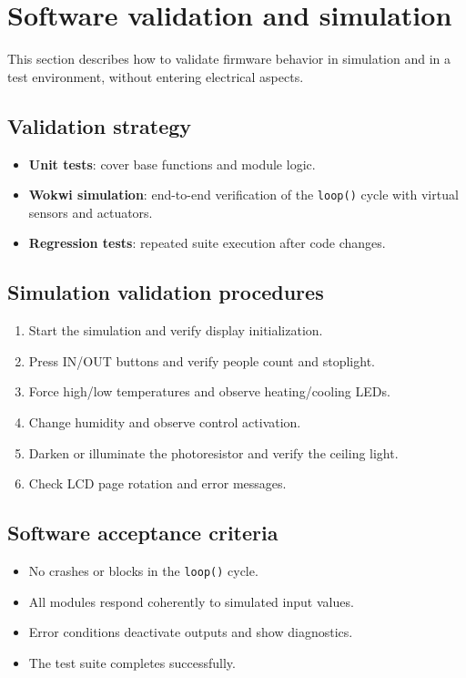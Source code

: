 \chapter{Software validation and simulation}

This section describes how to validate firmware behavior in simulation and in a test environment, without entering electrical aspects.

\section{Validation strategy}
\begin{itemize}
  \item \textbf{Unit tests}: cover base functions and module logic.
  \item \textbf{Wokwi simulation}: end-to-end verification of the \texttt{loop()} cycle with virtual sensors and actuators.
  \item \textbf{Regression tests}: repeated suite execution after code changes.
\end{itemize}

\section{Simulation validation procedures}
\begin{enumerate}
  \item Start the simulation and verify display initialization.
  \item Press IN/OUT buttons and verify people count and stoplight.
  \item Force high/low temperatures and observe heating/cooling LEDs.
  \item Change humidity and observe control activation.
  \item Darken or illuminate the photoresistor and verify the ceiling light.
  \item Check LCD page rotation and error messages.
\end{enumerate}

\section{Software acceptance criteria}
\begin{itemize}
  \item No crashes or blocks in the \texttt{loop()} cycle.
  \item All modules respond coherently to simulated input values.
  \item Error conditions deactivate outputs and show diagnostics.
  \item The test suite completes successfully.
\end{itemize}
